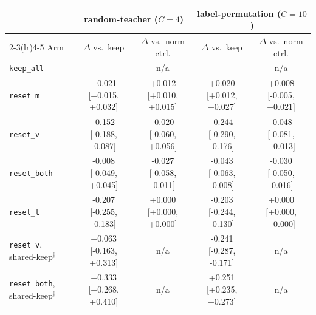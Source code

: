 \begin{tabular}{l cc cc}
\toprule
 & \multicolumn{2}{c}{random-teacher ($C{=}4$)} & \multicolumn{2}{c}{label-permutation ($C{=}10$)} \\
\cmidrule(lr){2-3}\cmidrule(lr){4-5}
Arm & $\Delta$ vs.\ keep & $\Delta$ vs.\ norm ctrl. & $\Delta$ vs.\ keep & $\Delta$ vs.\ norm ctrl. \\
\midrule
\texttt{keep\_all} & --- & n/a & --- & n/a \\
\texttt{reset\_m} & +0.021 [+0.015, +0.032] & +0.012 [+0.010, +0.015] & +0.020 [+0.012, +0.027] & +0.008 [-0.005, +0.021] \\
\texttt{reset\_v} & -0.152 [-0.188, -0.087] & -0.020 [-0.060, +0.056] & -0.244 [-0.290, -0.176] & -0.048 [-0.081, +0.013] \\
\texttt{reset\_both} & -0.008 [-0.049, +0.045] & -0.027 [-0.058, -0.011] & -0.043 [-0.063, -0.008] & -0.030 [-0.050, -0.016] \\
\texttt{reset\_t} & -0.207 [-0.255, -0.183] & +0.000 [+0.000, +0.000] & -0.203 [-0.244, -0.130] & +0.000 [+0.000, +0.000] \\
\midrule
\texttt{reset\_v}, shared-keep$^\dagger$ & +0.063 [-0.163, +0.313] & n/a & -0.241 [-0.287, -0.171] & n/a \\
\texttt{reset\_both}, shared-keep$^\dagger$ & +0.333 [+0.268, +0.410] & n/a & +0.251 [+0.235, +0.273] & n/a \\
\bottomrule
\end{tabular}
